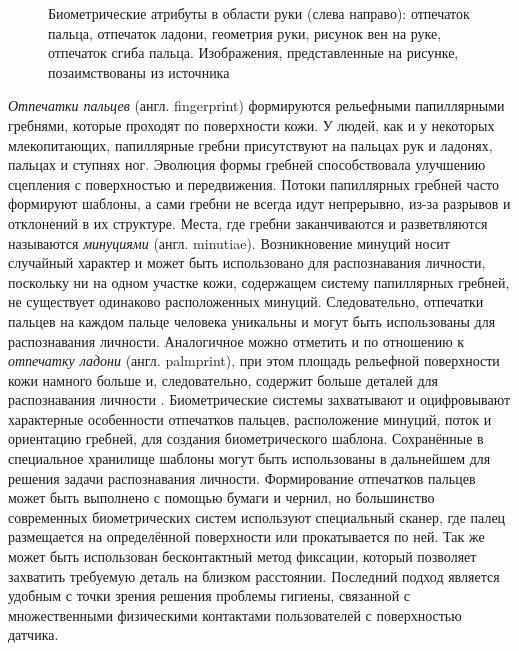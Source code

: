 \documentclass[12pt]{book}
\begin{document}
\begin{figure}[h]
\caption{Биометрические атрибуты в области руки (слева направо): отпечаток пальца, отпечаток ладони, геометрия руки, рисунок вен на руке, отпечаток сгиба пальца. Изображения, представленные на рисунке, позаимствованы из источника \cite{unar_2014}}
\label{fig:figure_1_2}
\end{figure}

\large{\textit{Отпечатки пальцев} (англ. fingerprint) формируются рельефными папиллярными гребнями, которые проходят по поверхности кожи. У людей, как и у некоторых млекопитающих, папиллярные гребни присутствуют на пальцах рук и ладонях, пальцах и ступнях ног. Эволюция формы гребней способствовала улучшению сцепления с поверхностью и передвижения. Потоки папиллярных гребней часто формируют шаблоны, а сами гребни не всегда идут непрерывно, из-за разрывов и отклонений в их структуре. Места, где гребни заканчиваются и разветвляются называются \textit{минуциями} (англ. minutiae). Возникновение минуций носит случайный характер и может быть использовано для распознавания личности, поскольку ни на одном участке кожи, содержащем систему папиллярных гребней, не существует одинаково расположенных минуций. Следовательно, отпечатки пальцев на каждом пальце человека уникальны и могут быть использованы для распознавания личности. Аналогичное можно отметить и по отношению к \textit{отпечатку ладони} (англ. palmprint), при этом площадь рельефной поверхности кожи намного больше и, следовательно, содержит больше деталей для распознавания личности \cite{unar_2014, minaee_2023, gao_2025}. Биометрические системы захватывают и оцифровывают характерные особенности отпечатков пальцев, расположение минуций, поток и ориентацию гребней, для создания биометрического шаблона. Сохранённые в специальное хранилище шаблоны могут быть использованы в дальнейшем для решения задачи распознавания личности. Формирование отпечатков пальцев может быть выполнено с помощью бумаги и чернил, но большинство современных биометрических систем используют специальный сканер, где палец размещается на определённой поверхности или прокатывается по ней. Так же может быть использован бесконтактный метод фиксации, который позволяет захватить требуемую деталь на близком расстоянии. Последний подход является удобным с точки зрения решения проблемы гигиены, связанной с множественными физическими контактами пользователей с поверхностью датчика.} 
\end{document}
